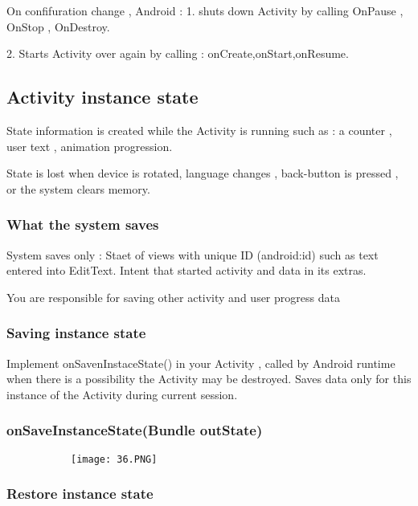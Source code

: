 \documentclass{article}
\begin{document}
  On confifuration change , Android : 1. shuts down Activity by calling OnPause , OnStop , OnDestroy.

  2.  Starts Activity over again by calling : onCreate,onStart,onResume.

  \subsection{Activity instance state}

  State information is created while the Activity is running such as :  a counter , user text , animation progression.
  
State is lost when device is rotated, language changes , back-button is pressed , or the system clears memory.

\subsubsection{What the system saves}

System saves only : Staet of views with unique ID (android:id) such as text entered into EditText. Intent that started activity and data in its extras.

You are responsible for saving other activity and user progress data

\subsubsection{Saving instance state}

Implement onSavenInstaceState() in your Activity , called by Android runtime when there is a possibility the Activity may be destroyed. Saves data only for this instance of the Activity during current session.

\subsubsection{onSaveInstanceState(Bundle outState)}

          \begin{figure}[ht!]
  \centering
  \begin{subfigure}[b]{0.5\linewidth}
    \texttt{[image: 36.PNG]}
  \end{subfigure}
  \end{figure}

  \subsubsection{Restore instance state}
\end{document}
